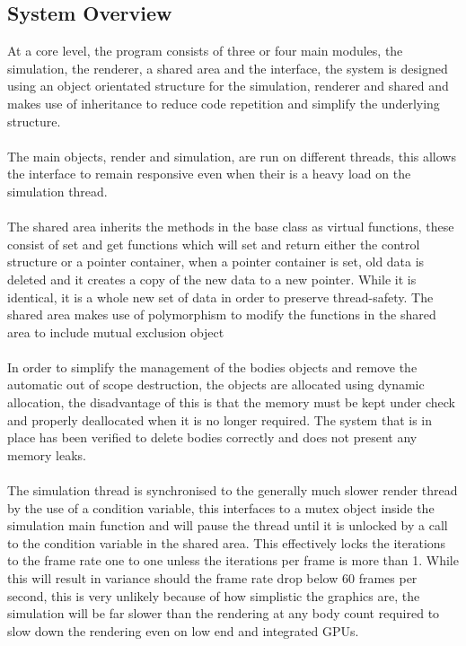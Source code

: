 \subsection{System Overview}
At a core level, the program consists of three or four main modules, the simulation, the renderer, a shared area and the interface, the system is designed using an object orientated structure for the simulation, renderer and shared and makes use of inheritance to reduce code repetition and simplify the underlying structure.

\paragraph{}
The main objects, render and simulation, are run on different threads, this allows the interface to remain responsive even when their is a heavy load on the simulation thread.

\paragraph{}
The shared area inherits the methods in the base class as virtual functions, these consist of set and get functions which will set and return either the control structure or a pointer container, when a pointer container is set, old data is deleted and it creates a copy of the new data to a new pointer. While it is identical, it is a whole new set of data in order to preserve thread-safety. The shared area makes use of polymorphism to modify the functions in the shared area to include mutual exclusion object

\paragraph{}
In order to simplify the management of the bodies objects and remove the automatic out of scope destruction, the objects are allocated using dynamic allocation, the disadvantage of this is that the memory must be kept under check and properly deallocated when it is no longer required. The system that is in place has been verified to delete bodies correctly and does not present any memory leaks.

\paragraph{}
The simulation thread is synchronised to the generally much slower render thread by the use of a condition variable, this interfaces to a mutex object inside the simulation main function and will pause the thread until it is unlocked by a call to the condition variable in the shared area. This effectively locks the iterations to the frame rate one to one unless the iterations per frame is more than 1. While this will result in variance should the frame rate drop below 60 frames per second, this is very unlikely because of how simplistic the graphics are, the simulation will be far slower than the rendering at any body count required to slow down the rendering even on low end and integrated GPUs.

